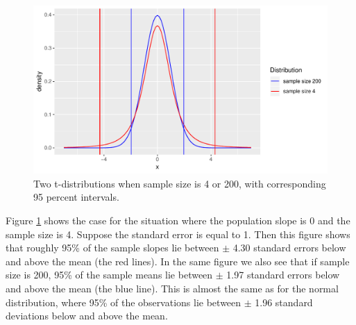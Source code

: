 \documentclass[]{report}\usepackage[]{graphicx}\usepackage[]{color}
\makeatletter
\def\maxwidth{ %
  \ifdim\Gin@nat@width>\linewidth
    \linewidth
  \else
    \Gin@nat@width
  \fi
}
\newenvironment{knitrout}{}{} %
\makeatother
\begin{document}

\begin{knitrout}
\color{fgcolor}\begin{figure}

{\centering \includegraphics[width=\maxwidth]{figure/inf_10-1} 

}

\caption[Two t-distributions when sample size is 4 or 200, with corresponding 95 percent intervals]{Two t-distributions when sample size is 4 or 200, with corresponding 95 percent intervals.}\label{fig:inf_10}
\end{figure}


\end{knitrout}



Figure \ref{fig:inf_10} shows the case for the situation where the population slope is 0 and the sample size is 4. Suppose the standard error is equal to 1. Then this figure shows that roughly 95\% of the sample slopes lie between $\pm$ 4.30 standard errors below and above the mean (the red lines). In the same figure we also see that if sample size is 200, 95\% of the sample means lie between $\pm$ 1.97 standard errors below and above the mean (the blue line). This is almost the same as for the normal distribution, where 95\% of the observations lie between $\pm$ 1.96 standard deviations below and above the mean.
\end{document}
